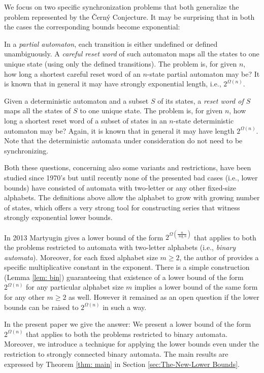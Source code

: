 \documentclass{ws-ijmpc}
\begin{document}
We focus on two specific synchronization problems that both generalize
the problem represented by the \v{C}ern\'{y} Conjecture. It may be
surprising that in both the cases the corresponding bounds become
exponential:
\begin{itemlist}
\item In a \emph{partial automaton}, each transition is either undefined
or defined unambiguously. A\emph{ careful reset word} of such automaton
maps all the states to one unique state (using only the defined transitions).
The problem is, for given $n$, how long a shortest careful reset
word of an $n$-state partial automaton may be? It is known that in
general it may have strongly exponential length, i.e., $2^{\Omega\left(n\right)}$.
\item Given a deterministic automaton and a subset $S$ of its states, a
\emph{reset word of $S$} maps all the states of $S$ to one unique
state. The problem is, for given $n$, how long a shortest reset word
of a subset of states in an $n$-state deterministic automaton may
be? Again, it is known that in general it may have length $2^{\Omega\left(n\right)}$.
Note that the deterministic automata under consideration do not need
to be synchronizing.
\end{itemlist}
Both these questions, concerning also some variants and restrictions,
have been studied since 1970's but until recently none of the presented
bad cases (i.e., lower bounds) have consisted of automata with two-letter
or any other fixed-size alphabets. The definitions above allow the
alphabet to grow with growing number of states, which offers a very
strong tool for constructing series that witness strongly exponential
lower bounds. 

In 2013 Martyugin \citep{MAR5} gives a lower bound of the form $2^{\Omega\left(\frac{n}{\log n}\right)}$
that applies to both the problems restricted to automata with two-letter
alphabets (i.e., \emph{binary automata}). Moreover, for each fixed
alphabet size $m\ge2$, the author of \citep{MAR5} provides a specific
multiplicative constant in the exponent. There is a simple construction
(Lemma \ref{lem: bin}) guaranteeing that existence of a lower bound
of the form $2^{\Omega\left(n\right)}$ for any particular alphabet
size $m$ implies a lower bound of the same form for any other $m\ge2$
as well. However it remained as an open question if the lower bounds
can be raised to $2^{\Omega\left(n\right)}$ in such a way.

In the present paper we give the answer: We present a lower bound
of the form $2^{\Omega\left(n\right)}$ that applies to both the problems
restricted to binary automata. Moreover, we introduce a technique
for applying the lower bounds even under the restriction to strongly
connected binary automata. The main results are expressed by Theorem
\ref{thm: main} in Section \ref{sec:The-New-Lower Bounds}.
\end{document}
